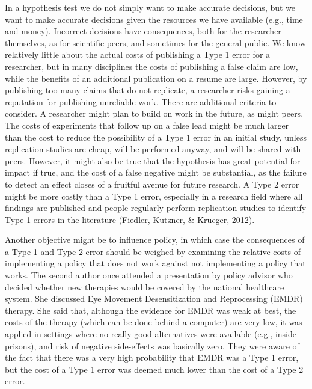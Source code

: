 \documentclass[
  english,
  ,jou, a4paper,floatsintext]{apa6}
\begin{document}
In a hypothesis test we do not simply want to make accurate decisions, but we want to make accurate decisions given the resources we have available (e.g., time and money). Incorrect decisions have consequences, both for the researcher themselves, as for scientific peers, and sometimes for the general public. We know relatively little about the actual costs of publishing a Type 1 error for a researcher, but in many disciplines the costs of publishing a false claim are low, while the benefits of an additional publication on a resume are large. However, by publishing too many claims that do not replicate, a researcher risks gaining a reputation for publishing unreliable work. There are additional criteria to consider. A researcher might plan to build on work in the future, as might peers. The costs of experiments that follow up on a false lead might be much larger than the cost to reduce the possibility of a Type 1 error in an initial study, unless replication studies are cheap, will be performed anyway, and will be shared with peers. However, it might also be true that the hypothesis has great potential for impact if true, and the cost of a false negative might be substantial, as the failure to detect an effect closes of a fruitful avenue for future research. A Type 2 error might be more costly than a Type 1 error, especially in a research field where all findings are published and people regularly perform replication studies to identify Type 1 errors in the literature (Fiedler, Kutzner, \& Krueger, 2012).

Another objective might be to influence policy, in which case the consequences of a Type 1 and Type 2 error should be weighed by examining the relative costs of implementing a policy that does not work against not implementing a policy that works. The second author once attended a presentation by policy advisor who decided whether new therapies would be covered by the national healthcare system. She discussed Eye Movement Desensitization and Reprocessing (EMDR) therapy. She said that, although the evidence for EMDR was weak at best, the costs of the therapy (which can be done behind a computer) are very low, it was applied in settings where no really good alternatives were available (e.g., inside prisons), and risk of negative side-effects was basically zero. They were aware of the fact that there was a very high probability that EMDR was a Type 1 error, but the cost of a Type 1 error was deemed much lower than the cost of a Type 2 error.
\end{document}
